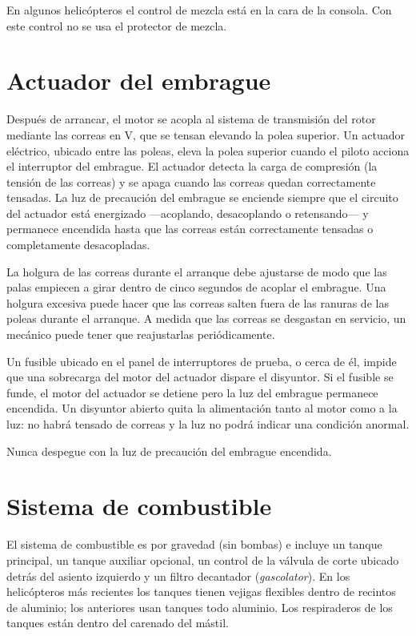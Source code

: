 \begin{nota}
En algunos helicópteros el control de mezcla está en la cara de la consola. Con este control no se usa el protector de mezcla.
\end{nota}

\section{Actuador del embrague}

Después de arrancar, el motor se acopla al sistema de transmisión del rotor mediante las correas en V, que se tensan elevando la polea superior. Un actuador eléctrico, ubicado entre las poleas, eleva la polea superior cuando el piloto acciona el interruptor del embrague. El actuador detecta la carga de compresión (la tensión de las correas) y se apaga cuando las correas quedan correctamente tensadas. La luz de precaución del embrague se enciende siempre que el circuito del actuador está energizado ---acoplando, desacoplando o retensando--- y permanece encendida hasta que las correas están correctamente tensadas o completamente desacopladas.

La holgura de las correas durante el arranque debe ajustarse de modo que las palas empiecen a girar dentro de cinco segundos de acoplar el embrague. Una holgura excesiva puede hacer que las correas salten fuera de las ranuras de las poleas durante el arranque. A medida que las correas se desgastan en servicio, un mecánico puede tener que reajustarlas periódicamente.

Un fusible ubicado en el panel de interruptores de prueba, o cerca de él, impide que una sobrecarga del motor del actuador dispare el disyuntor. Si el fusible se funde, el motor del actuador se detiene pero la luz del embrague permanece encendida. Un disyuntor abierto quita la alimentación tanto al motor como a la luz: no habrá tensado de correas y la luz no podrá indicar una condición anormal.

\begin{precaucion}
Nunca despegue con la luz de precaución del embrague encendida.
\end{precaucion}

\section{Sistema de combustible}

El sistema de combustible es por gravedad (sin bombas) e incluye un tanque principal, un tanque auxiliar opcional, un control de la válvula de corte ubicado detrás del asiento izquierdo y un filtro decantador (\emph{gascolator}). En los helicópteros más recientes los tanques tienen vejigas flexibles dentro de recintos de aluminio; los anteriores usan tanques todo aluminio. Los respiraderos de los tanques están dentro del carenado del mástil.

